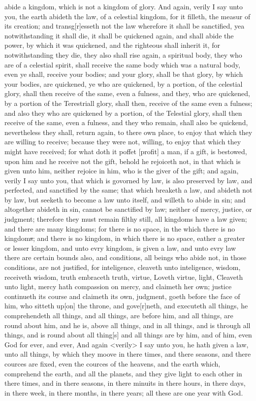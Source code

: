 abide a kingdom, which is not a kingdom of glory. And again, verily I say unto you, the earth abideth the law, of a celestial kingdom, for it filleth, the measur of its creation; and transg[r]esseth not the law wherefore it shall be sanctified, yea notwithstanding it shall die, it shall be quickened again, and shall abide the power, by which it was quickened, and the righteous shall inherit it, for notwithstanding they die, they also shall rise again, a spiritual body, they who are of a celestial spirit, shall receive the same body which was a natural body, even ye shall, receive your bodies; and your glory, shall be that glory, by which your bodies, are quickened, ye who are quickened, by a portion, of the celestial glory, shall then receive of the same, even a fulness, and they, who are quickened, by a portion of the Terestriall glory, shall then, receive of the same even a fulness; and also they who are quickened by a portion, of the Telestial glory, shall then receive of the same, even a fulness, and they who remain, shall also be quickend, nevertheless they shall, return again, to there own place, to enjoy that which they are willing to receive; because they were not, willing, to enjoy that which they might have received; for what doth it poffet [profit] a man, if a gift, is bestowed, upon him and he receive not the gift, behold he rejoiceth not, in that which is given unto him, neither rejoice in him, who is the giver of the gift; and again, verily I say unto you, that which is govorned by law, is also preserved by law, and perfected, and sanctified by the same; that which breaketh a law, and abideth not by law, but seeketh to become a law unto itself, and willeth to abide in sin; and altogether abideth in sin, cannot be sanctified by law; neither of mercy, justice, or judgment; therefore they must remain filthy still, all kingdoms have a law given; and there are many kingdoms; for there is no space, in the which there is no kingdom\sout{s}; and there is no kingdom, in which there is no space, eather a greater or lesser kingdom, and unto evry kingdom, is given a law, and unto evry law there are certain bounds also, and conditions, all beings who abide not, in those conditions, are not justified, for inteligence, cleaveth unto inteligence, wisdom, receiveth wisdom, truth embraceth truth, virtue, Loveth virtue, light, Cleaveth unto light, mercy hath compassion on mercy, and claimeth her own; justice continueth its course and claimeth its own, judgment, goeth before the face of him, who sitteth up[on] the throne, and gove[r]neth, and executeth all things, he comprehendeth all things, and all things, are before him, and all things, are round about him, and he is, above all things, and in all things, and is through all things, and is round about all thing[s] and all things are by him, and of him, even God for ever, and ever, And again <verily> I say unto you, he hath given a law, unto all things, by which they moove in there times, and there seasons, and there cources are fixed, even the cources of the heavens, and the earth which, comprehend the earth, and all the planets, and they give light to each other in there times, and in there seasons, in there minuits in there hours, in there days, in there week, in there months, in there years; all these are one year with God. 